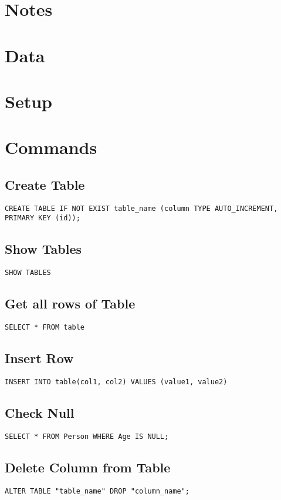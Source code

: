 \documentclass{article}
\title{\vspace{-2.25cm}{\small SQL}\vspace{-1.5cm}}
\date{}
\begin{document}
\maketitle
\begin{multicols}{3}
	
\section{Notes}
\section{Data}
\section{Setup}
\section{Commands}

\subsection{Create Table}
\lstinline|CREATE TABLE IF NOT EXIST table_name (column TYPE AUTO_INCREMENT, PRIMARY KEY (id));|

\subsection{Show Tables}
\lstinline|SHOW TABLES|

\subsection{Get all rows of Table}
\lstinline|SELECT * FROM table|

\subsection{Insert Row}
\lstinline|INSERT INTO table(col1, col2) VALUES (value1, value2)|

\subsection{Check Null}
\lstinline|SELECT * FROM Person WHERE Age IS NULL;|

\subsection{Delete Column from Table}
\lstinline|ALTER TABLE "table_name" DROP "column_name";|


\end{multicols}
\end{document}
